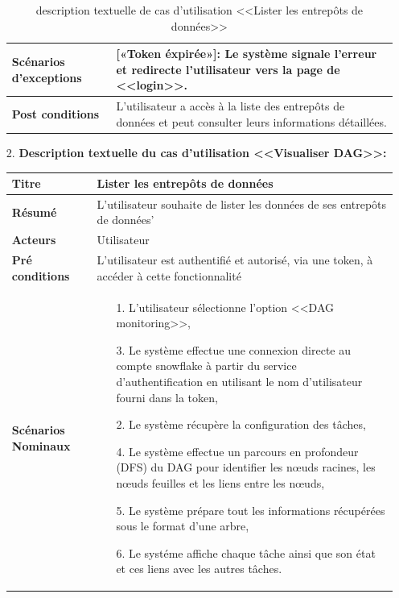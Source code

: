 \begin{enumerate}
\begin{table}[H]
\begin{tabular}{|p{3.5cm}|p{12cm}|}
                \hline  \textbf{Scénarios d'exceptions} & 
                    [«Token éxpirée»]: Le système signale l'erreur et redirecte l'utilisateur vers la page de <<login>>.\\
                \hline \textbf{Post conditions} & L'utilisateur a accès à la liste des entrepôts de données et peut consulter leurs informations détaillées.
         \\
                \hline
            \end{tabular}
            \caption{description textuelle de cas d'utilisation <<Lister les entrepôts de données>>}
        \end{table}
        \item[2.] \textbf{Description textuelle du cas d'utilisation <<Visualiser DAG>>:}
    \begin{table}[H]
        \centering
            \begin{tabular}{|p{3.5cm}|p{12cm}|}
                \hline \textbf{Titre} &  Lister les entrepôts de données \\
                \hline \textbf{Résumé} & L'utilisateur souhaite de lister les données de ses entrepôts de données' \\
                \hline \textbf{Acteurs} & Utilisateur\\
                \hline \textbf{Pré conditions }& L'utilisateur est authentifié et autorisé, via une token, à accéder à cette fonctionnalité\\
                \hline \textbf{Scénarios Nominaux} &
                    \begin{enumerate}
                        \item [1.] L'utilisateur sélectionne l'option <<DAG monitoring>>,
                        \item [3.] Le système effectue une connexion directe au compte snowflake à partir du service d'authentification en utilisant le nom d'utilisateur fourni dans la token,
                        \item [2.] Le système récupère la configuration des tâches,
                        \item [4.] Le système effectue un parcours en profondeur (DFS) du DAG pour identifier les nœuds racines, les nœuds feuilles et les liens entre les nœuds,
                        \item [5.] Le système prépare tout les informations récupérées sous le format d'une arbre,
                        \item [6.] Le systéme affiche chaque tâche ainsi que son état et ces liens avec les autres tâches.

\end{enumerate}
\end{tabular}
\end{table}
\end{enumerate}
